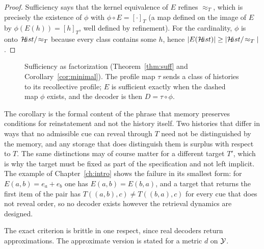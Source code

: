 \begin{proof}
Sufficiency says that the kernel equivalence of $E$ refines $\approx_T$, which is precisely the existence of $\phi$ with $\phi\circ E=[\cdot]_T$ (a map defined on the image of $E$ by $\phi(E(h))=[h]_T$, well defined by refinement). For the cardinality, $\phi$ is onto $\mathcal{H}\!ist/\!\approx_T$ because every class contains some $h$, hence $|E(\mathcal{H}\!ist)|\ge|\mathcal{H}\!ist/\!\approx_T|$.
\end{proof}


\begin{figure}[t]
\centering
{}
\caption{Sufficiency as factorization (Theorem~\ref{thm:suff} and Corollary~\ref{cor:minimal}). The profile map $\tau$ sends a class of histories to its recollective profile; $E$ is sufficient exactly when the dashed map $\phi$ exists, and the decoder is then $D=\tau\circ\phi$.}\label{fig:factor}
\end{figure}

The corollary is the formal content of the phrase that memory preserves conditions for reinstatement and not the history itself. Two histories that differ in ways that no admissible cue can reveal through $T$ need not be distinguished by the memory, and any storage that does distinguish them is surplus with respect to $T$. The same distinctions may of course matter for a different target $T'$, which is why the target must be fixed as part of the specification and not left implicit. The example of Chapter~\ref{ch:intro} shows the failure in its smallest form: for $E(a,b)=e_a+e_b$ one has $E(a,b)=E(b,a)$, and a target that returns the first item of the pair has $T((a,b),c)\ne T((b,a),c)$ for every cue that does not reveal order, so no decoder exists however the retrieval dynamics are designed.

The exact criterion is brittle in one respect, since real decoders return approximations. The approximate version is stated for a metric $d$ on $\mathcal{Y}$.

